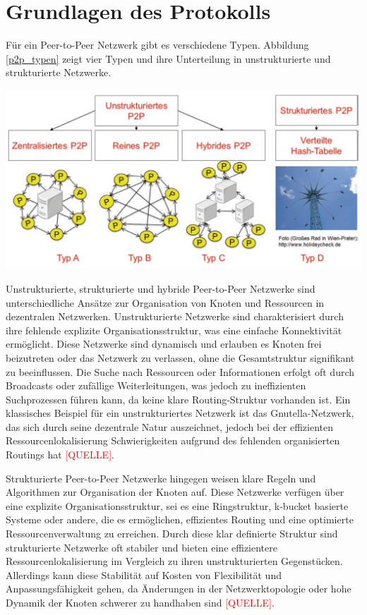 \section{Grundlagen des Protokolls}
\label{sec:grundlagen_des_protokolls}

Für ein Peer-to-Peer Netzwerk gibt es verschiedene Typen. Abbildung \ref{p2p_typen} zeigt 
vier Typen und ihre Unterteilung in unstrukturierte und strukturierte Netzwerke.

\begin{center}
    \captionsetup{type=figure}
    \includegraphics[width=1\linewidth]{images/peer_to_peer_typen.png}
    \label{p2p_typen}
\end{center}

\noindent Unstrukturierte, strukturierte und hybride Peer-to-Peer Netzwerke sind unterschiedliche Ansätze zur Organisation von Knoten und Ressourcen in dezentralen Netzwerken. Unstrukturierte Netzwerke sind charakterisiert durch ihre fehlende explizite Organisationsstruktur, was eine einfache Konnektivität ermöglicht. Diese Netzwerke sind dynamisch und erlauben es Knoten frei beizutreten oder das Netzwerk zu verlassen, ohne die Gesamtstruktur signifikant zu beeinflussen. Die Suche nach Ressourcen oder Informationen erfolgt oft durch Broadcasts oder zufällige Weiterleitungen, was jedoch zu ineffizienten Suchprozessen führen kann, da keine klare Routing-Struktur vorhanden ist. Ein klassisches Beispiel für ein unstrukturiertes Netzwerk ist das Gnutella-Netzwerk, das sich durch seine dezentrale Natur auszeichnet, jedoch bei der effizienten Ressourcenlokalisierung Schwierigkeiten aufgrund des fehlenden organisierten Routings hat \textcolor{red}{[QUELLE]}.

Strukturierte Peer-to-Peer Netzwerke hingegen weisen klare Regeln und Algorithmen zur Organisation der Knoten auf. Diese Netzwerke verfügen über eine explizite Organisationsstruktur, sei es eine Ringstruktur, k-bucket basierte Systeme oder andere, die es ermöglichen, effizientes Routing und eine optimierte Ressourcenverwaltung zu erreichen. Durch diese klar definierte Struktur sind strukturierte Netzwerke oft stabiler und bieten eine effizientere Ressourcenlokalisierung im Vergleich zu ihren unstrukturierten Gegenstücken. Allerdings kann diese Stabilität auf Kosten von Flexibilität und Anpassungsfähigkeit gehen, da Änderungen in der Netzwerktopologie oder hohe Dynamik der Knoten schwerer zu handhaben sind \textcolor{red}{[QUELLE]}.

